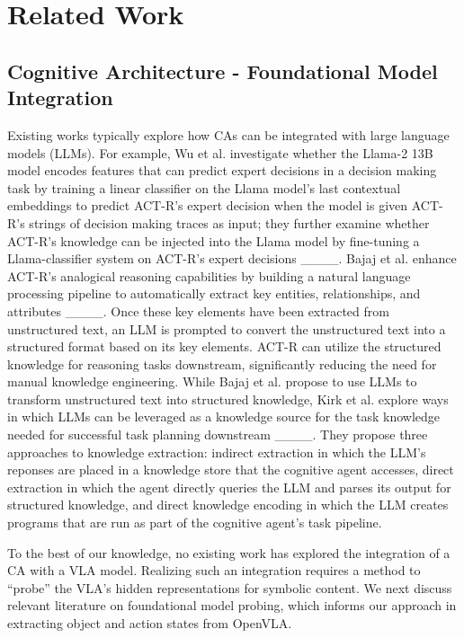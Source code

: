 \section{Related Work}
\subsection{Cognitive Architecture - Foundational Model Integration}
Existing works typically explore how CAs can be integrated with large language models (LLMs). For example, Wu et al. investigate whether the Llama-2 13B model encodes features that can predict expert decisions in a decision making task by training a linear classifier on the Llama model's last contextual embeddings to predict ACT-R's expert decision when the model is given ACT-R's strings of decision making traces as input; they further examine whether ACT-R's knowledge can be injected into the Llama model by fine-tuning a Llama-classifier system on ACT-R's expert decisions ____. Bajaj et al. enhance ACT-R's analogical reasoning capabilities by building a natural language processing pipeline to automatically extract key entities, relationships, and attributes ____. Once these key elements have been extracted from unstructured text, an LLM is prompted to convert the unstructured text into a structured format based on its key elements. ACT-R can utilize the structured knowledge for reasoning tasks downstream, significantly reducing the need for manual knowledge engineering. While Bajaj et al. propose to use LLMs to transform unstructured text into structured knowledge, Kirk et al. explore ways in which LLMs can be leveraged as a knowledge source for the task knowledge needed for successful task planning downstream ____. They propose three approaches to knowledge extraction: indirect extraction in which the LLM's reponses are placed in a knowledge store that the cognitive agent accesses, direct extraction in which the agent directly queries the LLM and parses its output for structured knowledge, and direct knowledge encoding in which the LLM creates programs that are run as part of the cognitive agent's task pipeline. 

To the best of our knowledge, no existing work has explored the integration of a CA with a VLA model. Realizing such an integration requires a method to ``probe'' the VLA’s hidden representations for symbolic content. We next discuss relevant literature on foundational model probing, which informs our approach in extracting object and action states from OpenVLA.

